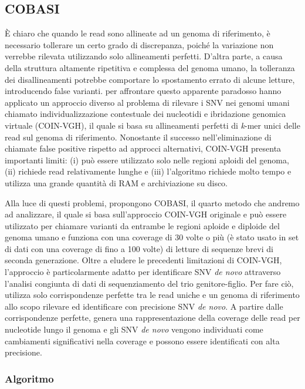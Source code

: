 \documentclass[../main.tex]{subfiles}
\begin{document}
\subsection{COBASI}
\label{cobasi}

È chiaro che quando le read sono allineate ad un genoma di riferimento, è necessario tollerare un certo grado di discrepanza, poiché la variazione non verrebbe rilevata utilizzando solo allineamenti perfetti. D'altra parte, a causa della struttura altamente ripetitiva e complessa del genoma umano, la tolleranza dei disallineamenti potrebbe comportare lo spostamento errato di alcune letture, introducendo false varianti.\cite{gomez-romero2018cobasi} per affrontare questo apparente paradosso hanno applicato un approccio diverso al problema di rilevare i SNV nei genomi umani chiamato individualizzazione contestuale dei nucleotidi e ibridazione genomica virtuale (COIN-VGH), il quale si basa su allineamenti perfetti di \textit{k}-mer unici delle read sul genoma di riferimento. Nonostante il successo nell'eliminazione di chiamate false positive rispetto ad approcci alternativi, COIN-VGH presenta importanti limiti: (i) può essere utilizzato solo nelle regioni aploidi del genoma, (ii) richiede read relativamente lunghe e (iii) l'algoritmo richiede molto tempo e utilizza una grande quantità di RAM e archiviazione su disco.

Alla luce di questi problemi, \cite{gomez-romero2018cobasi} propongono COBASI, il quarto metodo che andremo ad analizzare, il quale si basa sull'approccio COIN-VGH originale e può essere utilizzato per chiamare varianti da entrambe le regioni aploide e diploide del genoma umano e funziona con una coverage di 30 volte o più (è stato usato in set di dati con una coverage di fino a 100 volte) di letture di sequenze brevi di seconda generazione. Oltre a eludere le precedenti limitazioni di COIN-VGH, l'approccio è particolarmente adatto per identificare SNV \textit{de novo} attraverso l'analisi congiunta di dati di sequenziamento del trio genitore-figlio. Per fare ciò, utilizza solo corrispondenze perfette tra le read uniche e un genoma di riferimento allo scopo rilevare ed identificare con precisione SNV \textit{de novo}. A partire dalle corrispondenze perfette, genera una rappresentazione della coverage delle read per nucleotide lungo il genoma e gli SNV \textit{de novo} vengono individuati come cambiamenti significativi nella coverage e possono essere identificati con alta precisione.  


\subsubsection{Algoritmo}
\end{document}
